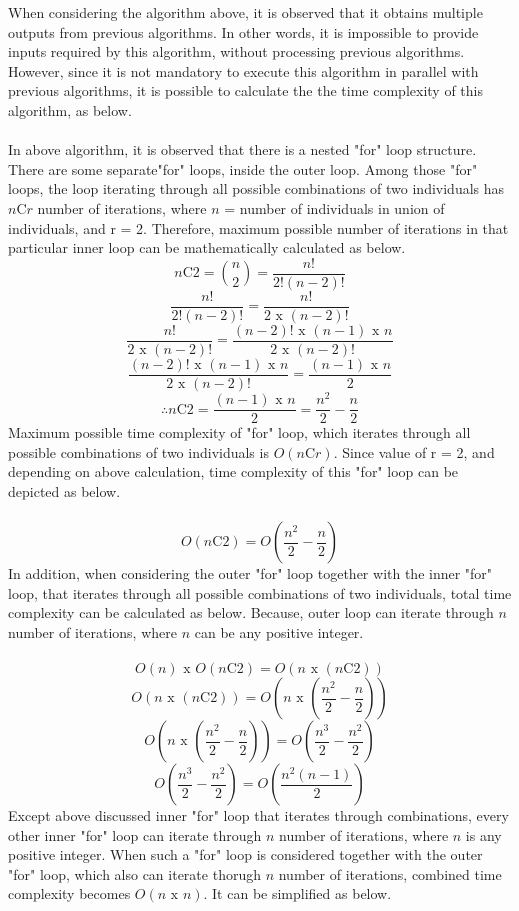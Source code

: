 When considering the algorithm above, it is observed that it obtains multiple outputs from previous algorithms. In other words, it is impossible to provide inputs required by this algorithm, without processing previous algorithms. However, since it is not mandatory to execute this algorithm in parallel with previous algorithms, it is possible to calculate the the time complexity of this algorithm, as below.\\ \\
In above algorithm, it is observed that there is a nested "for" loop structure. There are some separate"for" loops, inside the outer loop. Among those "for" loops, the loop iterating through all possible combinations of two individuals has $n \text{C} r$ number of iterations, where $n$ = number of individuals in union of individuals, and r = 2. Therefore, maximum possible number of iterations in that particular inner loop can be mathematically calculated as below. 
\[ n \text{C} 2 = \binom{n}{2} = \frac{n!}{2!(n-2)!} \]
\[ \frac{n!}{2!(n-2)!} = \frac{n!}{2 \text{ x } (n-2)!} \]
\[ \frac{n!}{2 \text{ x } (n-2)!} = \frac{{(n-2)! \text{ x } (n-1) \text{ x } n}}{2 \text{ x } (n-2)!} \]
\[ \frac{{(n-2)! \text{ x } (n-1) \text{ x } n}}{2 \text{ x } (n-2)!} = \frac{(n-1) \text{ x } n}{2} \]
\[ \therefore n \text{C} 2 = \frac{(n-1) \text{ x } n}{2} = \frac{n^2}{2} - \frac{n}{2} \]
Maximum possible time complexity of "for" loop, which iterates through all possible combinations of two individuals is $O(n \text{C} r)$. Since value of r = 2, and depending on above calculation, time complexity of this "for" loop can be depicted as below.\\ \\
\[ O(n \text{C} 2) = O(\frac{n^2}{2} - \frac{n}{2}) \]
In addition, when considering the outer "for" loop together with the inner "for" loop, that iterates through all possible combinations of two individuals, total time complexity can be calculated as below. Because, outer loop can iterate through $n$ number of iterations, where $n$ can be any positive integer.\\ \\
\[ O(n) \text{ x } O(n \text{C} 2) = O(n \text{ x } (n \text{C} 2)) \]
\[ O(n \text{ x } (n \text{C} 2)) = O(n \text{ x } (\frac{n^2}{2} - \frac{n}{2})) \]
\[ O(n \text{ x } (\frac{n^2}{2} - \frac{n}{2})) = O(\frac{n^3}{2} - \frac{n^2}{2}) \]
\[ O(\frac{n^3}{2} - \frac{n^2}{2}) = O(\frac{n^2(n - 1)}{2}) \]
Except above discussed inner "for" loop that iterates through combinations, every other inner "for" loop can iterate through $n$ number of iterations, where $n$ is any positive integer. When such a "for" loop is considered together with the outer "for" loop, which also can iterate thorugh $n$ number of iterations, combined time complexity becomes $O(n \text{ x } n)$. It can be simplified as below.\\ \\
